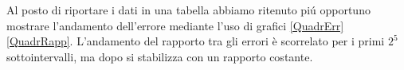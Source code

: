 
Al posto di riportare i dati in una tabella abbiamo ritenuto pi\'u opportuno mostrare l'andamento dell'errore mediante l'uso di grafici \ref{QuadrErr} \ref{QuadrRapp}.
L'andamento del rapporto tra gli errori è scorrelato per i primi $2^5$ sottointervalli, ma dopo si stabilizza con un rapporto costante.
